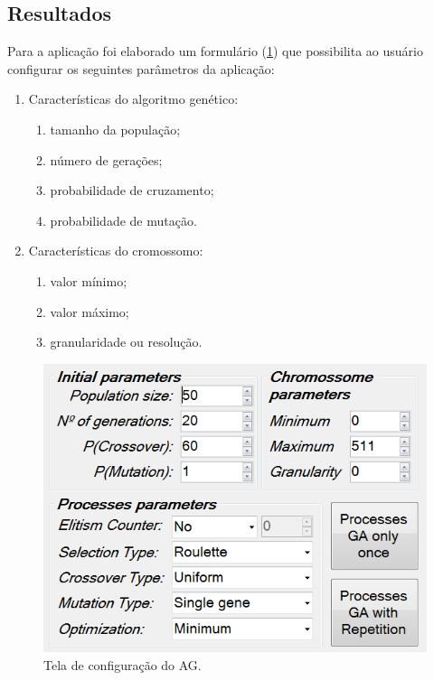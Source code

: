 \documentclass[twoside]{article}
\begin{document}
\begin{multicols}{2}

\section{Resultados}
Para a aplicação foi elaborado um formulário (\ref {fig:userview}) que possibilita ao usuário configurar os seguintes parâmetros da aplicação:
\begin{enumerate}
\item Características do algoritmo genético:
\begin{enumerate}
\item tamanho da população;
\item número de gerações;
\item probabilidade de cruzamento;
\item probabilidade de mutação.
\end{enumerate}
\item Características do cromossomo:
\begin{enumerate}
\item valor mínimo;
\item valor máximo;
\item granularidade ou resolução.
\end{enumerate}
\end{enumerate}

\begin{figure}[H]
\label{fig:userview}
  \caption{Tela de configuração do AG.}
  \centering
    \includegraphics[scale = 0.45]{user_view.png}
\end{figure}


\end{multicols}
\end{document}
